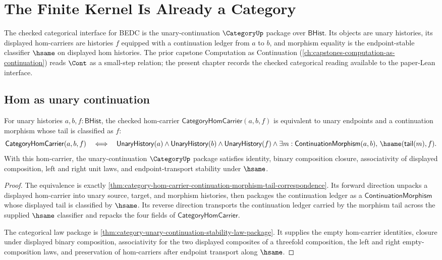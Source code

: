 \chapter{The Finite Kernel Is Already a Category}
\label{ch:capstones-kernel-as-category}

The checked categorical interface for BEDC is the unary-continuation
$\CategoryUp$ package over $\mathsf{BHist}$. Its objects are unary histories,
its displayed hom-carriers are histories $f$ equipped with a continuation
ledger from $a$ to $b$, and morphism equality is the endpoint-stable
classifier $\hsame$ on displayed hom histories. The prior capstone
Computation as Continuation (\autoref{ch:capstones-computation-as-continuation})
reads $\Cont$ as a small-step relation; the present chapter records the
checked categorical reading available to the paper-Lean interface.

\section{Hom as unary continuation}
\label{sec:kernel-as-category-hom-as-cont}

\begin{theorem}
\label{thm:kernel-as-category-unary-continuation-realization}
For unary histories $a,b,f:\mathsf{BHist}$, the checked hom-carrier
$\mathsf{CategoryHomCarrier}(a,b,f)$ is equivalent to unary endpoints and a
continuation morphism whose tail is classified as $f$:
$$
\mathsf{CategoryHomCarrier}(a,b,f)
\quad\Longleftrightarrow\quad
\mathsf{UnaryHistory}(a)\wedge
\mathsf{UnaryHistory}(b)\wedge
\mathsf{UnaryHistory}(f)\wedge
\exists m:\mathsf{ContinuationMorphism}(a,b),\,
\hsame(\mathsf{tail}(m),f).
$$
With this hom-carrier, the unary-continuation $\CategoryUp$ package satisfies
identity, binary composition closure, associativity of displayed composition,
left and right unit laws, and endpoint-transport stability under $\hsame$.
\end{theorem}

\begin{proof}
The equivalence is exactly
\autoref{thm:category-hom-carrier-continuation-morphism-tail-correspondence}.
Its forward direction unpacks a displayed hom-carrier into unary source,
target, and morphism histories, then packages the continuation ledger as a
$\mathsf{ContinuationMorphism}$ whose displayed tail is classified by
$\hsame$. Its reverse direction transports the continuation ledger carried by
the morphism tail across the supplied $\hsame$ classifier and repacks the four
fields of $\mathsf{CategoryHomCarrier}$.

The categorical law package is
\autoref{thm:category-unary-continuation-stability-law-package}. It supplies
the empty hom-carrier identities, closure under displayed binary composition,
associativity for the two displayed composites of a threefold composition,
the left and right empty-composition laws, and preservation of hom-carriers
after endpoint transport along $\hsame$.
\end{proof}

